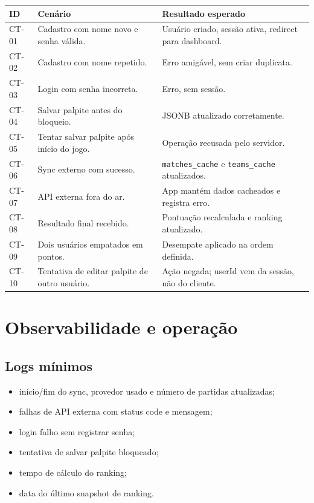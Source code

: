 \documentclass[12pt,a4paper]{article}
\begin{document}
\begin{longtable}{p{}p{}p{}}
\toprule
\textbf{ID} & \textbf{Cenário} & \textbf{Resultado esperado} \\
\midrule
CT-01 & Cadastro com nome novo e senha válida. & Usuário criado, sessão ativa, redirect para dashboard. \\
CT-02 & Cadastro com nome repetido. & Erro amigável, sem criar duplicata. \\
CT-03 & Login com senha incorreta. & Erro, sem sessão. \\
CT-04 & Salvar palpite antes do bloqueio. & JSONB atualizado corretamente. \\
CT-05 & Tentar salvar palpite após início do jogo. & Operação recusada pelo servidor. \\
CT-06 & Sync externo com sucesso. & \texttt{matches\_cache} e \texttt{teams\_cache} atualizados. \\
CT-07 & API externa fora do ar. & App mantém dados cacheados e registra erro. \\
CT-08 & Resultado final recebido. & Pontuação recalculada e ranking atualizado. \\
CT-09 & Dois usuários empatados em pontos. & Desempate aplicado na ordem definida. \\
CT-10 & Tentativa de editar palpite de outro usuário. & Ação negada; userId vem da sessão, não do cliente. \\
\bottomrule
\end{longtable}

\section{Observabilidade e operação}

\subsection{Logs mínimos}

\begin{itemize}
  \item início/fim do sync, provedor usado e número de partidas atualizadas;
  \item falhas de API externa com status code e mensagem;
  \item login falho sem registrar senha;
  \item tentativa de salvar palpite bloqueado;
  \item tempo de cálculo do ranking;
  \item data do último snapshot de ranking.
\end{itemize}
\end{document}
